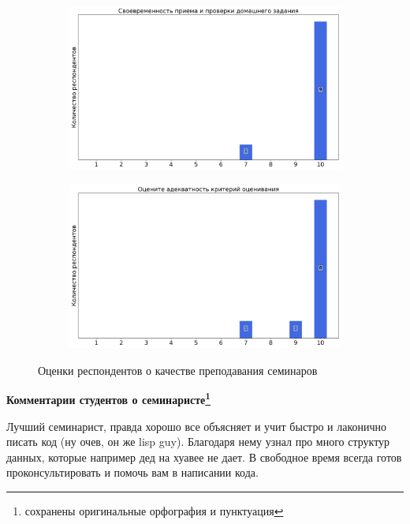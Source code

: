 \begin{figure}[H]
\begin{subfigure}[b]{0.45\textwidth}
                \includegraphics[width=\textwidth]{images/1 course/Информатика/seminarists-marks-Винокуров Н.А.-2.png}
            \end{subfigure}
            \begin{subfigure}[b]{0.45\textwidth}
                \centering
                \includegraphics[width=\textwidth]{images/1 course/Информатика/seminarists-marks-Винокуров Н.А.-3.png}
            \end{subfigure}	
            \caption{Оценки респондентов о качестве преподавания семинаров}
        \end{figure}

        \textbf{Комментарии студентов о семинаристе\protect\footnote{сохранены оригинальные орфография и пунктуация}}
            \begin{commentbox} 
                Лучший семинарист, правда хорошо все объясняет и учит быстро и лаконично писать код (ну очев, он же  lisp guy). Благодаря нему узнал про много структур данных, которые например дед на хуавее не дает. В свободное время всегда готов проконсультировать и помочь вам в написании кода. 
            \end{commentbox} 
        
